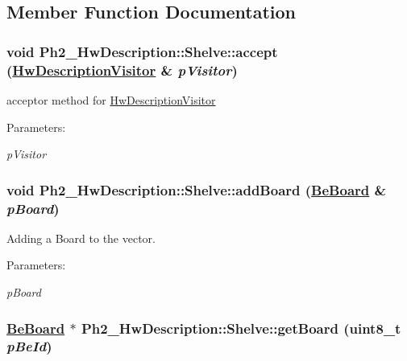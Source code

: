 \subsection{Member Function Documentation}
\hypertarget{class_ph2___hw_description_1_1_shelve_c27ba0b5a780a71c7e8aaa05b785eab0}{
\subsubsection[accept]{\setlength{\rightskip}{0pt plus 5cm}void Ph2\_\-Hw\-Description::Shelve::accept (\hyperlink{class_hw_description_visitor}{Hw\-Description\-Visitor} \& {\em p\-Visitor})}}
\label{class_ph2___hw_description_1_1_shelve_c27ba0b5a780a71c7e8aaa05b785eab0}


acceptor method for \hyperlink{class_hw_description_visitor}{Hw\-Description\-Visitor} 

\begin{Desc}
\item[Parameters:]
\begin{description}
\item[{\em p\-Visitor}]\end{description}
\end{Desc}
\hypertarget{class_ph2___hw_description_1_1_shelve_a6ab700f126822c6da156760f130aba6}{
\subsubsection[addBoard]{\setlength{\rightskip}{0pt plus 5cm}void Ph2\_\-Hw\-Description::Shelve::add\-Board (\hyperlink{class_ph2___hw_description_1_1_be_board}{Be\-Board} \& {\em p\-Board})}}
\label{class_ph2___hw_description_1_1_shelve_a6ab700f126822c6da156760f130aba6}


Adding a Board to the vector. 

\begin{Desc}
\item[Parameters:]
\begin{description}
\item[{\em p\-Board}]\end{description}
\end{Desc}
\hypertarget{class_ph2___hw_description_1_1_shelve_4b3d05cdf618b323e37fffdc3872476e}{
\subsubsection[getBoard]{\setlength{\rightskip}{0pt plus 5cm}\hyperlink{class_ph2___hw_description_1_1_be_board}{Be\-Board} $\ast$ Ph2\_\-Hw\-Description::Shelve::get\-Board (uint8\_\-t {\em p\-Be\-Id})}}
\label{class_ph2___hw_description_1_1_shelve_4b3d05cdf618b323e37fffdc3872476e}


